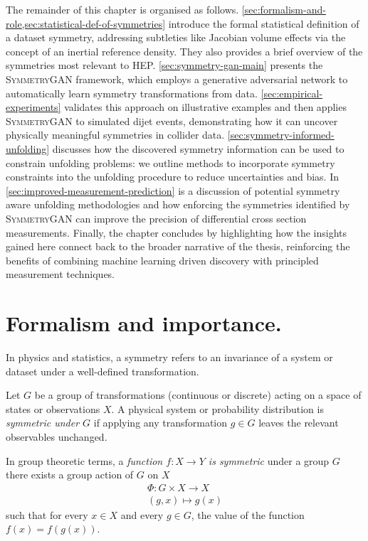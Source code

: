     The remainder of this chapter is organised as follows.
    \cref{sec:formalism-and-role,sec:statistical-def-of-symmetries} introduce the formal statistical definition of a dataset symmetry, addressing subtleties like Jacobian volume effects via the concept of an inertial reference density.
    They also provides a brief overview of the symmetries most relevant to HEP.
    \cref{sec:symmetry-gan-main} presents the \textsc{SymmetryGAN} framework, which employs a generative adversarial network to automatically learn symmetry transformations from data.
    \cref{sec:empirical-experiments} validates this approach on illustrative examples and then applies \textsc{SymmetryGAN} to simulated dijet events, demonstrating how it can uncover physically meaningful symmetries in collider data.
    \cref{sec:symmetry-informed-unfolding} discusses how the discovered symmetry information can be used to constrain unfolding problems: we outline methods to incorporate symmetry constraints into the unfolding procedure to reduce uncertainties and bias.
    In \cref{sec:improved-measurement-prediction} is a discussion of potential symmetry aware unfolding methodologies and how enforcing the symmetries identified by \textsc{SymmetryGAN} can improve the precision of differential cross section measurements.
    Finally, the chapter concludes by highlighting how the insights gained here connect back to the broader narrative of the thesis, reinforcing the benefits of combining machine learning driven discovery with principled measurement techniques.
\section{Formalism and importance.}
\label{sec:formalism-and-role}
\sectionminitoc
    In physics and statistics, a symmetry refers to an invariance of a system or dataset under a well-defined transformation.
    \begin{definition}
    \label{def:symmetry-under-a-group}
    Let $G$ be a group of transformations (continuous or discrete) acting on a space of states or observations $X$.
    A physical system or probability distribution is \emph{symmetric under $G$} if applying any transformation $g \in G$ leaves the relevant observables unchanged.
    \end{definition}
    \begin{definition}
    \label{def:symmetry-of-a-function}
        In group theoretic terms, a \emph{function \(f: X\to Y\) is symmetric} under a group \(G\) there exists a group action of \(G\) on \(X\) 
        \[
        \begin{split}
            \Phi: G\times X\to X\\
                (g, x) \mapsto g(x)
        \end{split}\]
       such that for every $x \in X$ and every $g \in G$, the value of the function \(f(x) = f(g(x))\).
    \end{definition}

